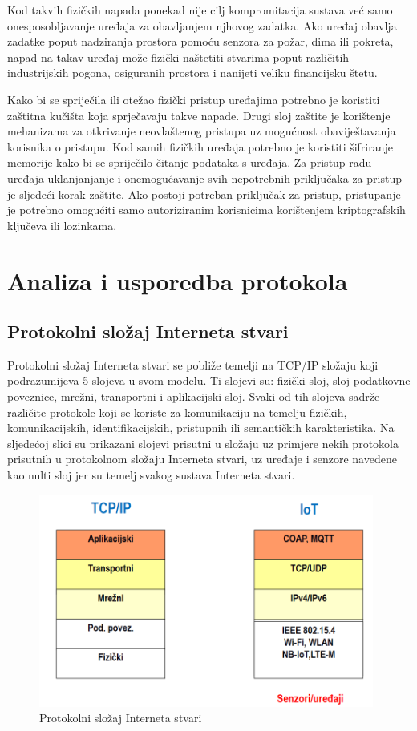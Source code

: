 \documentclass[times, utf8, diplomski]{fer}
\begin{document}
Kod takvih fizičkih napada ponekad nije cilj kompromitacija sustava već samo onesposobljavanje uređaja za obavljanjem njhovog zadatka. Ako uređaj obavlja zadatke poput nadziranja prostora pomoću senzora za požar, dima ili pokreta, napad na takav uređaj može fizički naštetiti stvarima poput različitih industrijskih pogona, osiguranih prostora i nanijeti veliku financijsku štetu.

Kako bi se spriječila ili otežao fizički pristup uređajima potrebno je koristiti zaštitna kučišta koja sprječavaju takve napade. Drugi sloj zaštite je korištenje mehanizama za otkrivanje neovlaštenog pristupa uz mogućnost obaviještavanja korisnika o pristupu. Kod samih fizičkih uređaja potrebno je koristiti šifriranje memorije kako bi se spriječilo čitanje podataka s uređaja. Za pristup radu uređaja uklanjanjanje i onemogućavanje svih nepotrebnih priključaka za pristup je sljedeći korak zaštite. Ako postoji potreban priključak za pristup, pristupanje je potrebno omogućiti samo autoriziranim korisnicima korištenjem kriptografskih ključeva ili lozinkama.

\chapter{Analiza i usporedba protokola}

\section{Protokolni složaj Interneta stvari}
Protokolni složaj Interneta stvari se pobliže temelji na TCP/IP složaju koji podrazumijeva 5 slojeva u svom modelu. Ti slojevi su: fizički sloj, sloj podatkovne poveznice, mrežni, transportni i aplikacijski sloj. Svaki od tih slojeva sadrže različite protokole koji se koriste za komunikaciju na temelju fizičkih, komunikacijskih, identifikacijskih, pristupnih ili semantičkih karakteristika. Na sljedećoj slici su prikazani slojevi prisutni u složaju uz primjere nekih protokola prisutnih u protokolnom složaju Interneta stvari, uz uređaje i senzore navedene kao nulti sloj jer su temelj svakog sustava Interneta stvari. 
\begin{figure}[htb]
    \centering
    \includegraphics[width=11cm]{images/iot-stack.png}
    \caption{Protokolni složaj Interneta stvari\citep{InternetStvari}}
    \label{fig:iotstack}
\end{figure}
\end{document}
